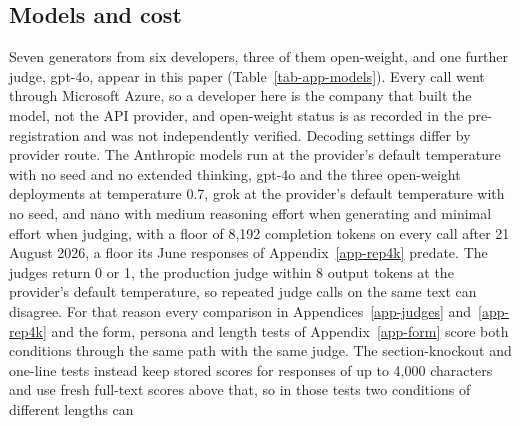 \subsection{Models and cost}
\label{app-cost}

Seven generators from six developers, three of them open-weight, and one
further judge, gpt-4o, appear in this paper (Table~\ref{tab-app-models}). Every call
went through Microsoft Azure, so a developer here is the company that built
the model, not the API provider, and open-weight status is as recorded in the
pre-registration and was not independently verified.
Decoding settings differ by provider route. The Anthropic models run at the
provider's default temperature with no seed and no extended thinking, gpt-4o
and the three open-weight deployments at temperature 0.7, grok at the
provider's default temperature with no seed, and nano with medium reasoning effort when generating
and minimal effort when judging, with a floor of 8,192 completion tokens on
every call after 21 August 2026, a floor its June responses of
Appendix~\ref{app-rep4k} predate.
The judges return 0 or 1, the production judge within 8 output tokens at the
provider's default temperature, so repeated judge calls on the same text can
disagree. For that reason every comparison in Appendices~\ref{app-judges}
and~\ref{app-rep4k} and the form, persona and length tests of
Appendix~\ref{app-form} score both conditions through the same path with the
same judge. The section-knockout and one-line tests instead keep stored
scores for responses of up to 4,000 characters and use fresh full-text
scores above that, so in those tests two conditions of different lengths can
